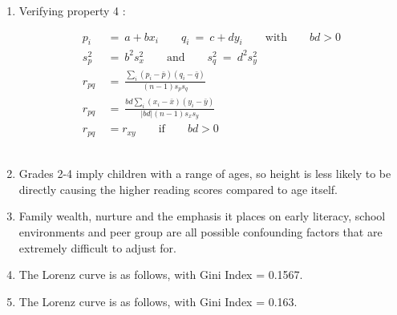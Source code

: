\begin{enumerate}
	\item Verifying property 4 : 
	
	
		\begin{align}
			p_i \ &=\  a + b x_i \qquad q_i \ =\  c + d y_i \qquad \text{with} \qquad bd > 0 \\
			s_{p}^{2} \ &=\ b^2 s_{x}^2 \qquad \text{and} \qquad s_{q}^{2} \ =\ d^2 s_{y}^2 \\
			r_{pq} \ &=\ \frac{\sum_{i} (p_i - \bar{p}) (q_i - \bar{q})}{(n - 1) s_p s_q} \\
			r_{pq} \ &=\ \frac{bd \sum_{i} (x_i - \bar{x}) (y_i - \bar{y})}{|bd| (n - 1) s_{x} s_{y}} \\
			r_{pq} &= r_{xy} \qquad \text{if} \qquad bd > 0			
		\end{align}
	\\
	
	\item Grades 2-4 imply children with a range of ages, so height is less likely to be directly causing the higher reading scores  compared to age itself. \\
	
	\item Family wealth, nurture and the emphasis it places on early literacy, school environments and peer group are all possible confounding factors that are extremely difficult to adjust for. \\
	
	\item The Lorenz curve is as follows, with Gini Index = 0.1567.
	
	\begin{figure}[H]
		\centering
	\end{figure} 
	
	\item The Lorenz curve is as follows, with Gini Index = 0.163. \\
	
	\begin{figure}[H]
		\centering
\end{figure}
\end{enumerate}
